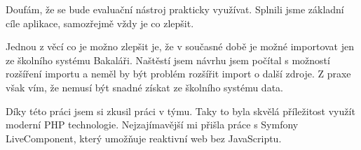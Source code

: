 Doufám, že se bude evaluační nástroj prakticky využívat. Splnili jsme základní cíle aplikace, samozřejmě vždy je co zlepšit.

Jednou z věcí co je možno zlepšit je, že v současné době je možné importovat jen ze školního systému Bakaláři.
Naštěstí jsem návrhu jsem počítal s možností rozšíření importu a neměl by být problém rozšířit import o další zdroje.
Z praxe však vím, že nemusí být snadné získat ze školního systému data.

Díky této práci jsem si zkusil práci v týmu.
Taky to byla skvělá příležitost využít moderní PHP technologie.
Nejzajímavější mi přišla práce s Symfony LiveComponent, který umožňuje reaktivní web bez JavaScriptu.
